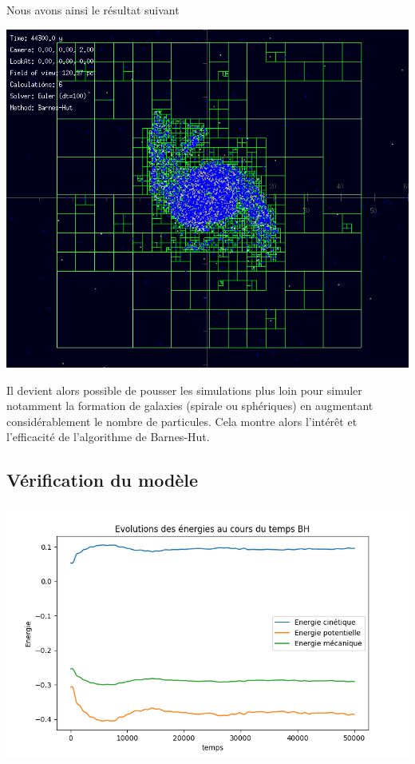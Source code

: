 Nous avons ainsi le résultat suivant
\begin{center}
\includegraphics[scale=0.8]{./images/BH_tree.png}
\captionsetup{hypcap=false}
\label{fig7}
\end{center}

Il devient alors possible de pousser les simulations plus loin pour simuler notamment la formation de galaxies (spirale ou sphériques) en augmentant considérablement le nombre de particules. Cela montre alors l'intérêt et l'efficacité de l'algorithme de Barnes-Hut.

\subsection{Vérification du modèle}

\begin{center}
\includegraphics[scale=0.6]{./resultats/Energy_BH.png}
\captionsetup{hypcap=false}
\label{fig9}
\end{center}

